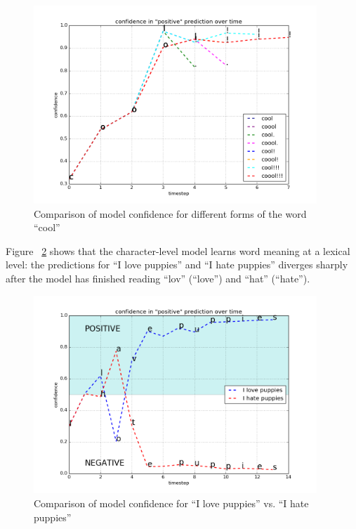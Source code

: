 \documentclass{article} %
\begin{document}
\begin{figure}[h!]
\begin{center}
\includegraphics[width=0.95\textwidth]{figs/cool}
\end{center}
\caption{Comparison of model confidence for different forms of the word ``cool''}
\label{fig:cool}
\end{figure}

Figure ~\ref{fig:puppies} shows that the character-level model learns word meaning at a lexical level: the predictions for ``I love puppies'' and ``I hate puppies'' diverges sharply after the model has finished reading ``lov'' (``love'') and ``hat'' (``hate'').

\begin{figure}[h!]

\begin{center}
\includegraphics[width=0.95\textwidth]{figs/puppies}
\end{center}
\caption{Comparison of model confidence for ``I love puppies'' vs. ``I hate puppies''}
\label{fig:puppies}
\end{figure}
\end{document}
